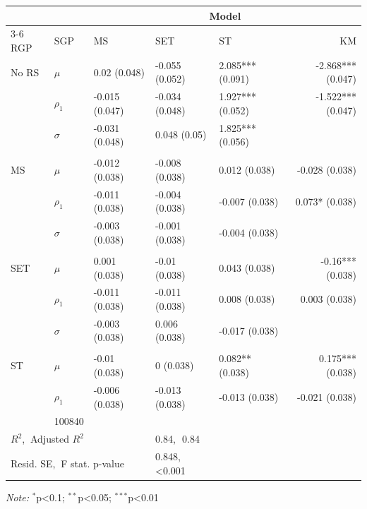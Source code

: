 \begin{tabular}{@{\extracolsep{\fill}}l|l|lllr}
\toprule\toprule
\multicolumn{2}{l}{} & \multicolumn{4}{c}{{Model}} \\ 
\cmidrule(lr){3-6}
RGP & SGP & MS & SET & ST & KM \\ 
\midrule\addlinespace[2.5pt]
No RS & \(\mu\) & 0.02 (0.048) & -0.055 (0.052) & 2.085*** (0.091) & -2.868*** (0.047) \\ 
 & \(\rho_{1}\) & -0.015 (0.047) & -0.034 (0.048) & 1.927*** (0.052) & -1.522*** (0.047) \\ 
 & \(\sigma\) & -0.031 (0.048) & 0.048 (0.05) & 1.825*** (0.056) &  \\ 
 &  &  &  &  &  \\ 
MS & \(\mu\) & -0.012 (0.038) & -0.008 (0.038) & 0.012 (0.038) & -0.028 (0.038) \\ 
 & \(\rho_{1}\) & -0.011 (0.038) & -0.004 (0.038) & -0.007 (0.038) & 0.073* (0.038) \\ 
 & \(\sigma\) & -0.003 (0.038) & -0.001 (0.038) & -0.004 (0.038) &  \\ 
 &  &  &  &  &  \\ 
SET & \(\mu\) & 0.001 (0.038) & -0.01 (0.038) & 0.043 (0.038) & -0.16*** (0.038) \\ 
 & \(\rho_{1}\) & -0.011 (0.038) & -0.011 (0.038) & 0.008 (0.038) & 0.003 (0.038) \\ 
 & \(\sigma\) & -0.003 (0.038) & 0.006 (0.038) & -0.017 (0.038) &  \\ 
 &  &  &  &  &  \\ 
ST & \(\mu\) & -0.01 (0.038) & 0 (0.038) & 0.082** (0.038) & 0.175*** (0.038) \\ 
 & \(\rho_{1}\) & -0.006 (0.038) & -0.013 (0.038) & -0.013 (0.038) & -0.021 (0.038) \\
\midrule\addlinespace[2.5pt]
\multicolumn{3}{l|}{Observations} & \multicolumn{1}{l}{100840} \\
\multicolumn{3}{l|}{$R^2$,$~$ Adjusted $R^2$} & \multicolumn{1}{l}{0.84,$~~~$0.84} \\
\multicolumn{3}{l|}{Resid. SE,$~$ F stat. p-value} & \multicolumn{1}{l}{0.848,$~~~$<0.001} \\
\bottomrule\bottomrule
\end{tabular}
\begin{minipage}{\linewidth}\centering
\vspace{.05em}
\emph{Note:}  \(^{*}\)p\textless{}0.1; \(^{**}\)p\textless{}0.05; \(^{***}\)p\textless{}0.01\\
\end{minipage}
